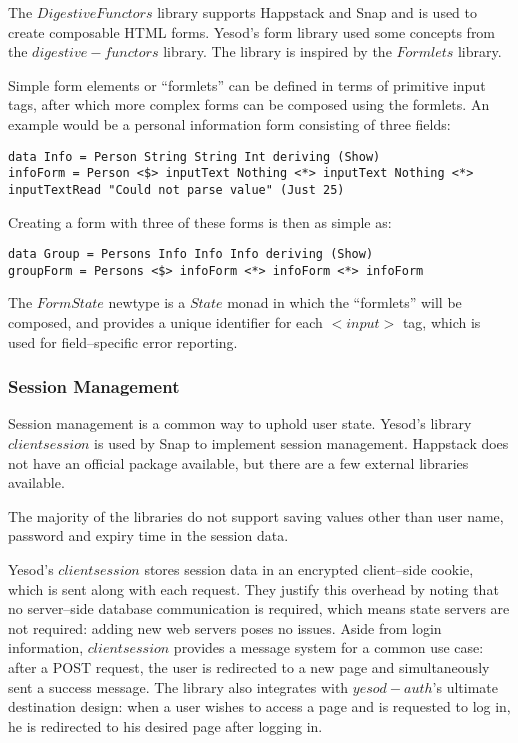 The $ Digestive Functors $ library supports Happstack and Snap and is used to create composable HTML forms.
Yesod's form library used some concepts from the $ digestive-functors $ library.\cite{AnnouncYesod08}
The library is inspired by the $ Formlets $ library.

Simple form elements or ``formlets'' can be defined in terms of primitive input tags, after which more complex forms can be composed using the formlets.
An example would be a personal information form consisting of three fields:

\begin{lstlisting}
data Info = Person String String Int deriving (Show)
infoForm = Person <$> inputText Nothing <*> inputText Nothing <*> inputTextRead "Could not parse value" (Just 25)
\end{lstlisting}

Creating a form with three of these forms is then as simple as:

\begin{lstlisting}
data Group = Persons Info Info Info deriving (Show)
groupForm = Persons <$> infoForm <*> infoForm <*> infoForm
\end{lstlisting}

The $ FormState $ newtype is a $ State $ monad in which the ``formlets'' will be composed, and provides a unique identifier for each $ <input> $ tag, which is used for field--specific error reporting.

\subsubsection{Session Management}

Session management is a common way to uphold user state. 
Yesod's library $ clientsession $ is used by Snap to implement session management.
Happstack does not have an official package available, but there are a few external libraries available.

The majority of the libraries do not support saving values other than user name, password and expiry time in the session data.

Yesod's $ clientsession $ stores session data in an encrypted client--side cookie, which is sent along with each request.
They justify this overhead by noting that no server--side database communication is required, which means state servers are not required: adding new web servers poses no issues.
Aside from login information, $ clientsession $ provides a message system for a common use case: after a POST request, the user is redirected to a new page and simultaneously sent a success message.
The library also integrates with $ yesod-auth $'s ultimate destination design: when a user wishes to access a page and is requested to log in, he is redirected to his desired page after logging in.

